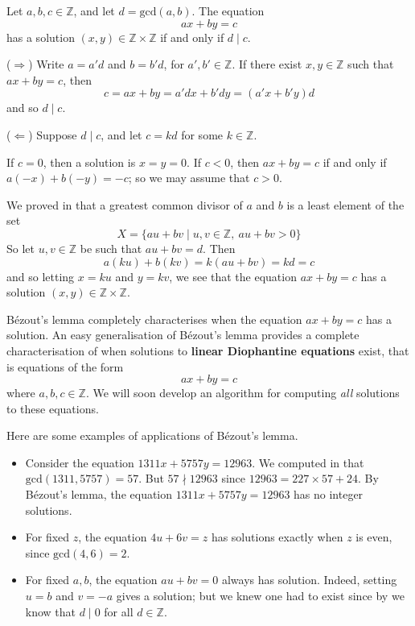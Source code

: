 \begin{theorem}
\label{thmBezout}
Let $a,b,c \in \mathbb{Z}$, and let $d = \mathrm{gcd}(a,b)$. The equation
\[ ax+by = c \]
has a solution $(x,y) \in \mathbb{Z} \times \mathbb{Z}$ if and only if $d \mid c$.
\end{theorem}
\begin{cproof}
($\Rightarrow$) Write $a=a'd$ and $b=b'd$, for $a',b' \in \mathbb{Z}$. If there exist $x,y \in \mathbb{Z}$ such that $ax+by=c$, then 
\[ c = ax+by = a'dx+b'dy = (a'x+b'y)d \]
and so $d \mid c$.

($\Leftarrow$) Suppose $d \mid c$, and let $c=kd$ for some $k \in \mathbb{Z}$.

If $c=0$, then a solution is $x=y=0$. If $c<0$, then $ax+by=c$ if and only if $a(-x)+b(-y)=-c$; so we may assume that $c>0$.

We proved in  that a greatest common divisor of $a$ and $b$ is a least element of the set
\[ X = \{ au+bv \mid u,v \in \mathbb{Z},\ au+bv > 0 \} \]
So let $u,v \in \mathbb{Z}$ be such that $au+bv=d$. Then
\[ a(ku) + b(kv) = k(au+bv) = kd = c \]
and so letting $x=ku$ and $y=kv$, we see that the equation $ax+by=c$ has a solution $(x,y) \in \mathbb{Z} \times \mathbb{Z}$.
\end{cproof}

B\'{e}zout's lemma completely characterises when the equation $ax+by=c$ has a solution. An easy generalisation of B\'{e}zout's lemma provides a complete characterisation of when solutions to \textbf{linear Diophantine equations} exist, that is equations of the form
\[ ax+by=c \]
where $a,b,c \in \mathbb{Z}$. We will soon develop an algorithm for computing \textit{all} solutions to these equations.

\begin{example}
Here are some examples of applications of B\'{e}zout's lemma.
\begin{itemize}
\item Consider the equation $1311x+5757y=12963$. We computed in  that $\mathrm{gcd}(1311,5757) = 57$. But $57 \nmid 12963$ since $12963 = 227 \times 57 + 24$. By B\'{e}zout's lemma, the equation $1311x+5757y=12963$ has no integer solutions.
\item For fixed $z$, the equation $4u+6v=z$ has solutions exactly when $z$ is even, since $\mathrm{gcd}(4,6)=2$.
\item For fixed $a,b$, the equation $au+bv=0$ always has solution. Indeed, setting $u=b$ and $v=-a$ gives a solution; but we knew one had to exist since by  we know that $d \mid 0$ for all $d \in \mathbb{Z}$.
\end{itemize}
\end{example}


